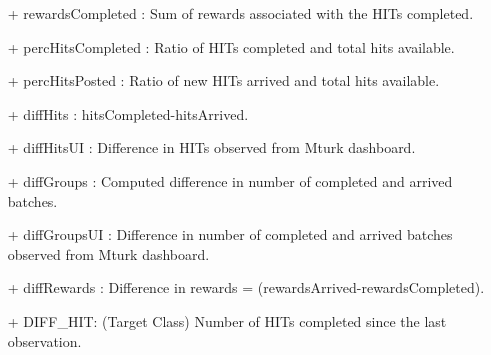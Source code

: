 \begin{itemize}[noitemsep,topsep=0pt,parsep=0pt,partopsep=0pt]
\item[+] rewardsCompleted : Sum of rewards associated with the HITs completed.
\item[+] percHitsCompleted : Ratio of HITs completed and total hits available.
\item[+] percHitsPosted : Ratio of new HITs arrived and total hits available.
\item[+] diffHits : hitsCompleted-hitsArrived.
\item[+] diffHitsUI : Difference in HITs observed from Mturk dashboard.
\item[+] diffGroups  : Computed difference in number of completed and arrived batches.
\item[+] diffGroupsUI : Difference in number of completed and arrived batches observed from Mturk dashboard.
\item[+] diffRewards : Difference in rewards = (rewardsArrived-rewardsCompleted).
\item[+] DIFF\_HIT:  (Target Class) Number of HITs completed since the last observation.
\end{itemize}

